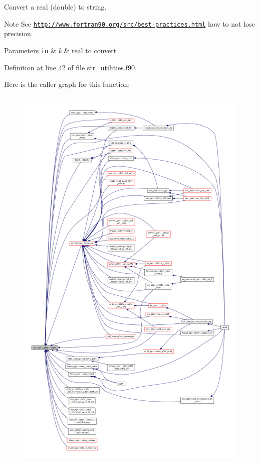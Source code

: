 Convert a real (double) to string. 

\begin{DoxyNote}{Note}
See \href{http://www.fortran90.org/src/best-practices.html}{\tt http\+://www.\+fortran90.\+org/src/best-\/practices.\+html} how to not lose precision.
\end{DoxyNote}

\begin{DoxyParams}[1]{Parameters}
\mbox{\tt in}  & {\em k} & real to convert \\
\hline
\end{DoxyParams}


Definition at line 42 of file str\+\_\+utilities.\+f90.

Here is the caller graph for this function\+:\nopagebreak
\begin{figure}[H]
\begin{center}
\leavevmode
\includegraphics[height=550pt]{namespacestr__utilities_a92ac6c0af1979df094de1caddd28ade0_icgraph}
\end{center}
\end{figure}
\mbox{\label{namespacestr__utilities_ac778d706b2e021672618939ab58fdd32}} 
